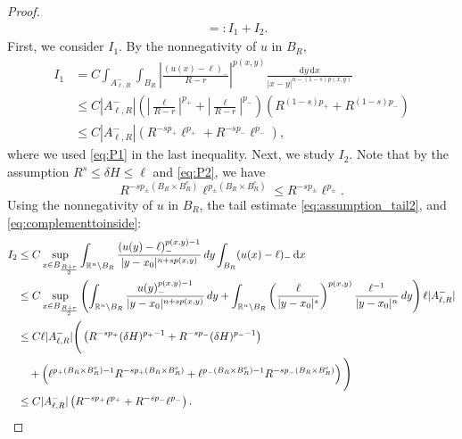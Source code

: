 \documentclass[11pt]{amsart}
\theoremstyle{plain}
\theoremstyle{definition}
\numberwithin{equation}{section}
\renewcommand{\d}{\textnormal{d}}
\newcommand{\R}{\mathbb{R}}
\begin{document}
\begin{proof}
\begin{align*}
& =: I_1 +  I_2.
\end{align*}
First, we consider $I_1$. By the nonnegativity of $u$ in $B_R$,
\begin{align*}
I_1 & = C \int_{ A_{\ell,R}^{-}} \int_{B_R} \left| \frac{(u(x)-\ell)_-}{R-r} \right|^{p(x,y)} \frac{\mathrm{d}y \,\mathrm{d}x}{|x-y|^{n-(1-s)p(x,y)}} \\
& \leq C |A_{\ell,R}^{-}| \left( \left|\frac{\ell}{R-r}\right|^{p_{+}} + \left|\frac{\ell}{R-r}\right|^{p_{-}}\right) \left( R^{(1-s)p_{+}} + R^{(1-s)p_{-}} \right) \\
&\leq C |A_{\ell,R}^{-}| \left(R^{-sp_{+}}\ell^{p_{+}} + R^{-sp_{-}}\ell^{p_{-}}\right),
\end{align*}
where we used \eqref{eq:P1} in the last inequality.
Next, we study $I_2$. Note that by the assumption $R^s\leq \delta H\leq \ell$ and \eqref{eq:P2}, we have 
\begin{equation}\label{eq:complementtoinside}
 R^{-s p_{\pm}(B_R\times B_R^c)} \ell^{p_{\pm}(B_R\times B_R^c)}   \leq R^{-s p_{\pm}} \ell^{p_{\pm}}.
\end{equation}
Using the nonnegativity of $u$ in $B_R$, the tail estimate \eqref{eq:assumption_tail2}, and \eqref{eq:complementtoinside}:
\begin{align*}
I_2&\leq C \sup_{x \in B_{\frac{R+r}{2}}} \int_{\R^n \setminus B_R} \frac{(u(y)-\ell)_-^{p(x,y)-1}}{|y-x_0|^{n+sp(x,y)}} \, \d y \int_{B_R} (u(x)-\ell)_- \,\mathrm{d}x\\
 & \leq C \sup_{x \in B_{\frac{R+r}{2}}}\left(\int_{\R^n \setminus B_R} \frac{u(y)_-^{p(x,y)-1}}{|y-x_0|^{n+sp(x,y)}} \, \d y 
+\int_{\R^n \setminus B_R} \left(\frac{\ell}{|y-x_0|^{s}}\right)^{p(x,y)} \frac{\ell^{-1}}{|y-x_0|^n} \, \d y\right) \ell |A_{\ell,R}^{-}|   \\
& \leq C\ell |A_{\ell,R}^{-}|\Bigg(\left( R^{-sp_+} (\delta H)^{p_+-1} + R^{-sp_-} (\delta H)^{p_--1} \right)\\
& \quad +\left( \ell^{p_{+}(B_R\times B_R^c)-1}R^{-sp_{+}(B_R\times B_R^c)} +\ell^{p_{-}(B_R\times B_R^c)-1}R^{-sp_{-}(B_R\times B_R^c)}  \right)\Bigg) \\
&\leq C|A_{\ell,R}^{-}|\left(R^{-sp_{+}}\ell^{p_{+}} + R^{-sp_{-}}\ell^{p_{-}}\right).
\end{align*}


\end{proof}
\end{document}
